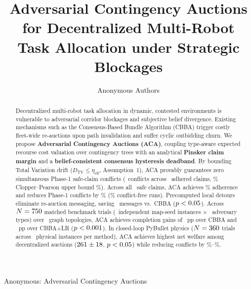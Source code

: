 \documentclass[lettersize,journal]{IEEEtran}
\begin{document}


\title{Adversarial Contingency Auctions for Decentralized Multi-Robot Task Allocation under Strategic Blockages}

\newif\ifanonymous
\anonymoustrue %

\ifanonymous
\author{Anonymous Authors}
\markboth{}%
{Anonymous: Adversarial Contingency Auctions}
\else
\author{Author Names Hidden for Peer Review%
\thanks{Author and institutional affiliations omitted for double-blind peer review. Full details restored upon final publication.}%
}
\markboth{}%
{Authors: Adversarial Contingency Auctions}
\fi

\maketitle

\begin{abstract}
Decentralized multi-robot task allocation in dynamic, contested environments is vulnerable to adversarial corridor blockages and subjective belief divergence. Existing mechanisms such as the Consensus-Based Bundle Algorithm (CBBA) trigger costly fleet-wide re-auctions upon path invalidation and suffer cyclic outbidding churn. We propose \textbf{Adversarial Contingency Auctions (ACA)}, coupling type-aware expected recourse cost valuation over contingency trees with an analytical \textbf{Pinsker claim margin} and a \textbf{belief-consistent consensus hysteresis deadband}. By bounding Total Variation drift ($D_{\mathrm{TV}} \le \eta_{\mathrm{eff}}$, Assumption~1), ACA provably guarantees zero simultaneous Phase-1 safe-claim conflicts (\aeTheoremConflicts\ conflicts across \aeSafeClaimsAdhered\ adhered claims, \aeConfidenceLevel\% Clopper--Pearson upper bound \aeTheoremConflictRateUpper\%). Across all \aeSafeClaimsTotal\ safe claims, ACA achieves \aeAdherencePerClaim\% adherence and reduces Phase-1 conflicts by \aeHfourSafeConflictReductionPct\% (\aeConflictFreeRunPct\% conflict-free runs). Precomputed local detours eliminate re-auction messaging, saving \aeMsgDiffCbba\ messages vs.\ CBBA ($p < 0.05$). Across $N = 750$ matched benchmark trials (\aeBenchmarkClusters\ independent map-seed instances $\times$ \aeAdversaryCount\ adversary types) over \aeBenchmarkMapCount\ graph topologies, ACA achieves completion gains of \aeCompletionDiffCbba~pp over CBBA and \aeHtwoCbbaLrDiff~pp over CBBA+LR ($p < 0.001$). In closed-loop PyBullet physics ($N = 360$ trials across \aeSitlPhysicalInstances\ physical instances per method), ACA achieves highest net welfare among decentralized auctions ($261 \pm 18$, $p < 0.05$) while reducing conflicts by \aeSitlConflictReductionNoMarginPct\%--\aeSitlConflictReductionCbbaPrLrPct\%.
\end{abstract}
\end{document}
